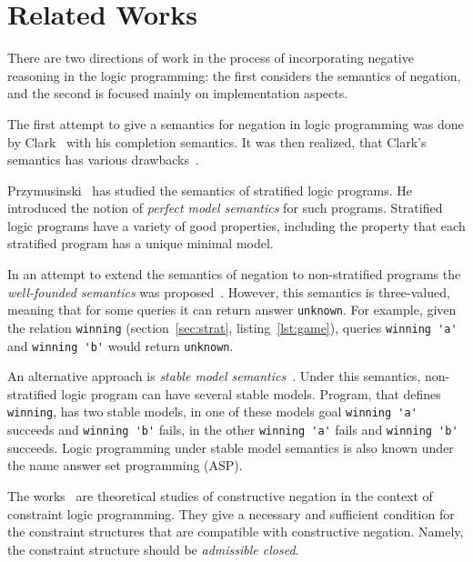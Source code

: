 \section{Related Works}

\label{sec:related-works}

There are two directions of work in the process of 
incorporating negative reasoning in the logic programming:
the first considers the semantics of negation,
and the second is focused mainly on implementation aspects.

The first attempt to give a semantics 
for negation in logic programming 
was done by Clark~\cite{clark1978negation, chan1988constructive}
with his completion semantics.
It was then realized, that 
Clark's semantics has various drawbacks~\cite{van1991well}.

Przymusinski~\cite{przymusinski1989constructive} 
has studied the semantics of stratified logic programs.
He introduced the notion of \emph{perfect model semantics} for such programs.
Stratified logic programs have a variety of good properties,
including the property that each stratified program 
has a unique minimal model.

In an attempt to extend the semantics of negation
to non-stratified programs the 
\emph{well-founded semantics} was proposed~\cite{van1991well}.
However, this semantics is three-valued,
meaning that for some queries it 
can return answer \lstinline{unknown}.
For example, given the relation \lstinline{winning}
(section~\ref{sec:strat}, listing~\ref{lst:game}),
queries \lstinline{winning 'a'} and \lstinline{winning 'b'}
would return \lstinline{unknown}.

An alternative approach is 
\emph{stable model semantics}~\cite{gelfond1988stable}.
Under this semantics, non-stratified logic program
can have several stable models.
Program, that defines \lstinline{winning}, 
has two stable models, 
in one of these models goal 
\lstinline{winning 'a'} succeeds and 
\lstinline{winning 'b'} fails,
in the other \lstinline{winning 'a'} fails
and \lstinline{winning 'b'} succeeds.
Logic programming under stable model semantics
is also known under the name 
answer set programming (ASP).

The works~\cite{stuckey1991constructive, dovier2000necessary}
are theoretical studies of constructive negation
in the context of constraint logic programming.
They give a necessary and sufficient condition for the
constraint structures that are compatible with constructive negation.
Namely, the constraint structure should be \emph{admissible closed}.


